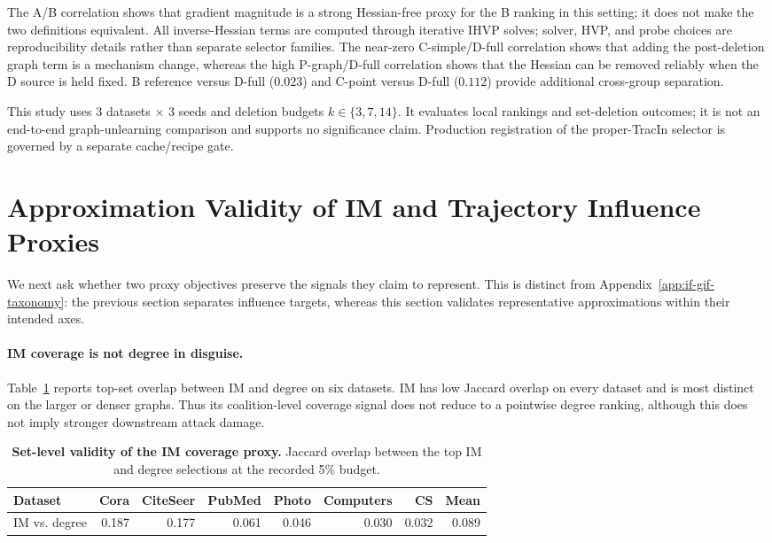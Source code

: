 The A/B correlation shows that gradient magnitude is a strong
Hessian-free proxy for the B ranking in this setting; it does not make
the two definitions equivalent.  All inverse-Hessian terms are computed
through iterative IHVP solves; solver, HVP, and probe choices are
reproducibility details rather than separate selector families.  The
near-zero C-simple/D-full correlation shows that adding
the post-deletion graph term is a mechanism change, whereas the high
P-graph/D-full correlation shows that the Hessian can be removed reliably
when the D source is held fixed.  B reference versus D-full ($0.023$) and
C-point versus D-full ($0.112$) provide additional cross-group separation.

This study uses $3$ datasets $\times$ $3$ seeds and deletion budgets
$k\in\{3,7,14\}$.  It evaluates local rankings and set-deletion outcomes;
it is not an end-to-end graph-unlearning comparison and supports no
significance claim.  Production registration of the proper-TracIn selector
is governed by a separate cache/recipe gate.

\section{Approximation Validity of IM and Trajectory Influence Proxies}
\label{app:approx-validity}

We next ask whether two proxy objectives preserve the signals they claim to
represent.  This is distinct from Appendix~\ref{app:if-gif-taxonomy}: the
previous section separates influence targets, whereas this section validates
representative approximations within their intended axes.

\paragraph{IM coverage is not degree in disguise.}
Table~\ref{tab:im-degree-validity} reports top-set overlap between IM and
degree on six datasets.  IM has low Jaccard overlap on every dataset and is
most distinct on the larger or denser graphs.  Thus its coalition-level
coverage signal does not reduce to a pointwise degree ranking, although this
does not imply stronger downstream attack damage.

\begin{table}[h]
\centering
\scriptsize
\caption{\textbf{Set-level validity of the IM coverage proxy.} Jaccard
overlap between the top IM and degree selections at the recorded 5\% budget.}
\label{tab:im-degree-validity}
\begin{tabular}{@{}lrrrrrrr@{}}
\toprule
Dataset & Cora & CiteSeer & PubMed & Photo & Computers & CS & Mean \\
\midrule
IM vs. degree & 0.187 & 0.177 & 0.061 & 0.046 & 0.030 & 0.032 & 0.089 \\
\bottomrule
\end{tabular}
\end{table}


